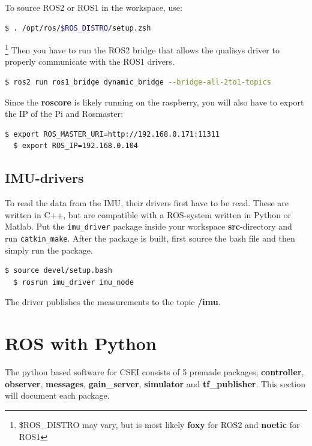 To source ROS2 or ROS1 in the workspace, use:

\begin{lstlisting}[language=bash,basicstyle=\mlttfamily, breaklines=true]
  $ . /opt/ros/$ROS_DISTRO/setup.zsh
\end{lstlisting}\footnote{\$ROS\_DISTRO may vary, but is most likely \textbf{foxy} for ROS2 and \textbf{noetic} for ROS1}
Then you have to run the ROS2 bridge that allows the qualisys driver to properly communicate with the ROS1 drivers. 

\begin{lstlisting}[language=bash,basicstyle=\mlttfamily, breaklines=true]
  $ ros2 run ros1_bridge dynamic_bridge --bridge-all-2to1-topics
\end{lstlisting}

Since the \textbf{roscore} is likely running on the raspberry, you will also have to export the IP of the Pi and Rosmaster: 

\begin{lstlisting}[language=bash,basicstyle=\mlttfamily, breaklines=true]
  $ export ROS_MASTER_URI=http://192.168.0.171:11311 
  $ export ROS_IP=192.168.0.104
\end{lstlisting}

\subsection{IMU-drivers}

To read the data from the IMU, their drivers first have to be read. These are written in C++, but are compatible with a ROS-system written in Python or Matlab. Put the \lstinline{imu_driver} package inside your workspace \textbf{src}-directory and run \lstinline{catkin_make}. After the package is built, first source the bash file and then simply run the package.

\begin{lstlisting}[language=bash,basicstyle=\mlttfamily, breaklines=true]
  $ source devel/setup.bash
  $ rosrun imu_driver imu_node
\end{lstlisting}

The driver publishes the measurements to the topic \textbf{/imu}. 


\section{ROS with Python}

The python based software for CSEI consists of 5 premade packages; \textbf{controller}, \textbf{observer}, \textbf{messages}, \textbf{gain\_server}, \textbf{simulator} and \textbf{tf\_publisher}. This section will document each package. 


